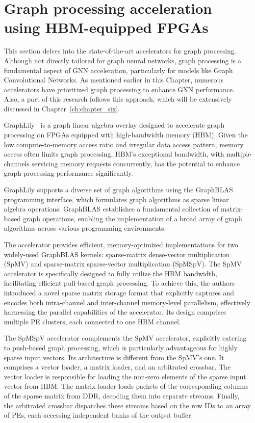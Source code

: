 \section{Graph processing acceleration using HBM-equipped FPGAs}
\label{sec:hbm-equipped-fpga-accelerators}%

This section delves into the state-of-the-art accelerators for graph processing.
Although not directly tailored for graph neural networks, graph processing is a fundamental aspect of GNN acceleration, particularly for models like Graph Convolutional Networks.
As mentioned earlier in this Chapter, numerous accelerators have prioritized graph processing to enhance GNN performance.
Also, a part of this research follows this approach, which will be extensively discussed in Chapter~\ref{ch:chapter_six}.

GraphLily~\cite{9643582} is a graph linear algebra overlay designed to accelerate graph processing on FPGAs equipped with high-bandwidth memory (HBM).
Given the low compute-to-memory access ratio and irregular data access pattern, memory access often limits graph processing.
HBM's exceptional bandwidth, with multiple channels servicing memory requests concurrently, has the potential to enhance graph processing performance significantly.

GraphLily supports a diverse set of graph algorithms using the GraphBLAS~\cite{DBLP:journals/corr/KepnerABBFGHKLM16} programming interface, which formulates graph algorithms as sparse linear algebra operations.
GraphBLAS establishes a fundamental collection of matrix-based graph operations, enabling the implementation of a broad array of graph algorithms across various programming environments.

The accelerator provides efficient, memory-optimized implementations for two widely-used GraphBLAS kernels: sparse-matrix dense-vector multiplication (SpMV) and sparse-matrix sparse-vector multiplication (SpMSpV).
The SpMV accelerator is specifically designed to fully utilize the HBM bandwidth, facilitating efficient pull-based graph processing.
To achieve this, the authors introduced a novel sparse matrix storage format that explicitly captures and encodes both intra-channel and inter-channel memory-level parallelism, effectively harnessing the parallel capabilities of the accelerator. Its design comprises multiple PE clusters, each connected to one HBM channel.

The SpMSpV accelerator complements the SpMV accelerator, explicitly catering to push-based graph processing, which is particularly advantageous for highly sparse input vectors.
Its architecture is different from the SpMV's one.
It comprises a vector loader, a matrix loader, and an arbitrated crossbar.
The vector loader is responsible for loading the non-zero elements of the sparse input vector from HBM. The matrix loader loads packets of the corresponding columns of the sparse matrix from DDR, decoding them into separate streams.
Finally, the arbitrated crossbar dispatches these streams based on the row IDs to an array of PEs, each accessing independent banks of the output buffer.

